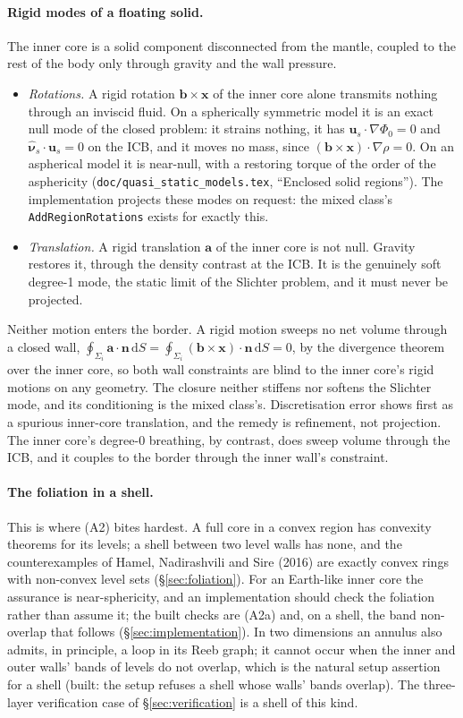 \documentclass[11pt]{article}
\theoremstyle{definition}
\theoremstyle{remark}
\newcommand{\bu}{\mathbf{u}}
\newcommand{\bn}{\mathbf{n}}
\newcommand{\bx}{\mathbf{x}}
\newcommand{\dS}{\,\mathrm{d}S}
\newcommand{\code}[1]{\texttt{#1}}
\newcommand{\nuhs}{\hat{\boldsymbol{\nu}}_s}
\begin{document}
\paragraph{Rigid modes of a floating solid.} The inner core is a solid
component disconnected from the mantle, coupled to the rest of the body
only through gravity and the wall pressure.
\begin{itemize}
\item \emph{Rotations.} A rigid rotation $\mathbf b\times\bx$ of the
  inner core alone transmits nothing through an inviscid fluid. On a
  spherically symmetric model it is an exact null mode of the closed
  problem: it strains nothing, it has $\bu_s\cdot\nabla\Phi_0 = 0$ and
  $\nuhs\cdot\bu_s = 0$ on the ICB, and it moves no mass, since
  $(\mathbf b\times\bx)\cdot\nabla\rho = 0$. On an aspherical model it
  is near-null, with a restoring torque of the order of the asphericity
  (\code{doc/quasi\_static\_models.tex}, ``Enclosed solid regions''). The
  implementation projects these modes on request: the mixed class's
  \code{AddRegionRotations} exists for exactly this.
\item \emph{Translation.} A rigid translation $\mathbf a$ of the inner
  core is not null. Gravity restores it, through the density contrast at
  the ICB. It is the genuinely soft degree-1 mode, the static limit of
  the Slichter problem, and it must never be projected.
\end{itemize}
Neither motion enters the border. A rigid motion sweeps no net volume
through a closed wall, $\oint_{\Sigma_i}\mathbf a\cdot\bn\dS =
\oint_{\Sigma_i}(\mathbf b\times\bx)\cdot\bn\dS = 0$, by the divergence
theorem over the inner core, so both wall constraints are blind to the
inner core's rigid motions on any geometry. The closure neither
stiffens nor softens the Slichter mode, and its conditioning is the
mixed class's. Discretisation error shows first as a spurious
inner-core translation, and the remedy is refinement, not projection.
The inner core's degree-0 breathing, by contrast, does sweep volume
through the ICB, and it couples to the border through the inner wall's
constraint.

\paragraph{The foliation in a shell.} This is where (A2) bites
hardest. A full core in a convex region has convexity theorems for its
levels; a shell between two level walls has none, and the
counterexamples of Hamel, Nadirashvili and Sire (2016) are exactly
convex rings with non-convex level sets (\S\ref{sec:foliation}). For an
Earth-like inner core the assurance is near-sphericity, and an
implementation should check the foliation rather than assume it; the
built checks are (A2a) and, on a shell, the band non-overlap that
follows (\S\ref{sec:implementation}). In two dimensions an annulus also
admits, in principle, a loop in its Reeb graph; it cannot occur when the
inner and outer walls' bands of levels do not overlap, which is the
natural setup assertion for a shell (built: the setup
refuses a shell whose walls' bands overlap). The three-layer
verification case of \S\ref{sec:verification} is a shell of this kind.
\end{document}
